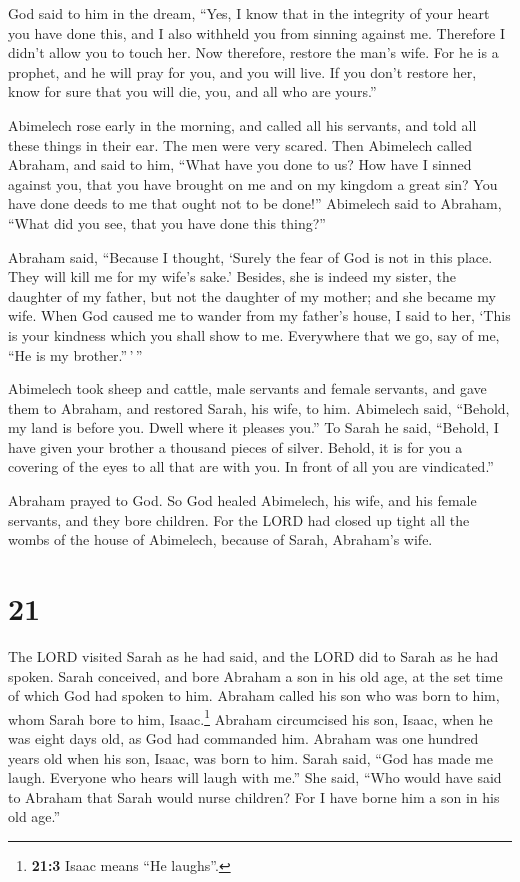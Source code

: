  God said to him in the dream, ``Yes, I know that in the
integrity of your heart you have done this, and I also withheld you from
sinning against me. Therefore I didn't allow you to touch her.
 Now therefore, restore the man's wife. For he is a
prophet, and he will pray for you, and you will live. If you don't
restore her, know for sure that you will die, you, and all who are
yours.''

 Abimelech rose early in the morning, and called all his
servants, and told all these things in their ear. The men were very
scared.  Then Abimelech called Abraham, and said to him,
``What have you done to us? How have I sinned against you, that you have
brought on me and on my kingdom a great sin? You have done deeds to me
that ought not to be done!''  Abimelech said to Abraham,
``What did you see, that you have done this thing?''

 Abraham said, ``Because I thought, `Surely the fear of
God is not in this place. They will kill me for my wife's sake.'
 Besides, she is indeed my sister, the daughter of my
father, but not the daughter of my mother; and she became my wife.
 When God caused me to wander from my father's house, I
said to her, `This is your kindness which you shall show to me.
Everywhere that we go, say of me, ``He is my brother.''\,'\,''

 Abimelech took sheep and cattle, male servants and
female servants, and gave them to Abraham, and restored Sarah, his wife,
to him.  Abimelech said, ``Behold, my land is before you.
Dwell where it pleases you.''  To Sarah he said,
``Behold, I have given your brother a thousand pieces of silver. Behold,
it is for you a covering of the eyes to all that are with you. In front
of all you are vindicated.''

 Abraham prayed to God. So God healed Abimelech, his
wife, and his female servants, and they bore children. 
For the LORD had closed up tight all the wombs of the house of
Abimelech, because of Sarah, Abraham's wife.

\hypertarget{section-20}{%
\section{21}\label{section-20}}

 The LORD visited Sarah as he had said, and the LORD did
to Sarah as he had spoken.  Sarah conceived, and bore
Abraham a son in his old age, at the set time of which God had spoken to
him.  Abraham called his son who was born to him, whom
Sarah bore to him, Isaac.\footnote{\textbf{21:3} Isaac means ``He
  laughs''.}  Abraham circumcised his son, Isaac, when he
was eight days old, as God had commanded him.  Abraham was
one hundred years old when his son, Isaac, was born to him.
 Sarah said, ``God has made me laugh. Everyone who hears
will laugh with me.''  She said, ``Who would have said to
Abraham that Sarah would nurse children? For I have borne him a son in
his old age.''

